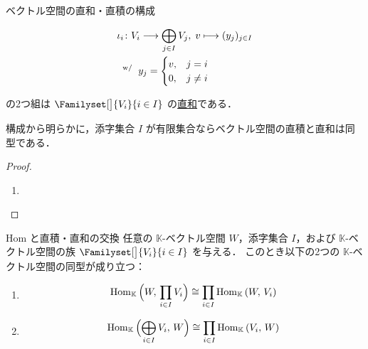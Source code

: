 \documentclass[rep_main]{subfiles}
\begin{document}
\begin{myprop}[label=prop:sum-vec,breakable]{ベクトル空間の直和・直積の構成}
\begin{enumerate}
\begin{itemize}
            \begin{align}
                &\iota_i \colon V_i \longrightarrow \bigoplus_{j \in I} V_j,\; v \longmapsto (y_j)_{j \in I} \\
                &\mathrel{} {}^{\mathrm{w}/} \mathrel{} y_j = \begin{cases}
                    v, &j=i \\
                    0, &j\neq i
                \end{cases}
            \end{align}
        \end{itemize}
        の2つ組は $\Familyset[\big]{V_i}{i\in I}$ の\hyperref[def:univ-vec-sum]{直和}である．
    \end{enumerate}
    
\end{myprop}

\begin{marker}
    構成から明らかに，添字集合 $I$ が有限集合ならベクトル空間の直積と直和は同型である．
\end{marker}

\begin{proof}
    \begin{enumerate}
        \item 
    \end{enumerate}
    
\end{proof}

\begin{myprop}[label=prop:hom-sum]{Hom と直積・直和の交換}
    任意の $\mathbb{K}$-ベクトル空間 $W$，添字集合 $I$，および $\mathbb{K}$-ベクトル空間の族 $\Familyset[\big]{V_i}{i\in I}$ を与える．
    このとき以下の2つの $\mathbb{K}$-ベクトル空間の同型が成り立つ：
    \begin{enumerate}
        \item 
        \begin{align}
            \mathrm{Hom}_{\mathbb{K}} \mathop{} \Bigl( W,\, \prod_{i \in I} V_i \Bigr) \cong \prod_{i \in I} \mathrm{Hom}_{\mathbb{K}} \mathop{}(W,\, V_i)
        \end{align}
        \item \begin{align}
            \mathrm{Hom}_{\mathbb{K}} \mathop{} \Bigl(\bigoplus_{i \in I} V_i,\, W\Bigr) \cong \prod_{i \in I} \mathrm{Hom}_{\mathbb{K}} \mathop{}(V_i,\, W)
        \end{align}
    \end{enumerate}
    
\end{myprop}
\end{document}
